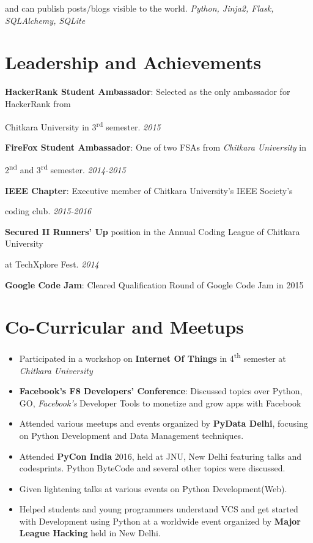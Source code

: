 \documentclass{ss_resume}
\begin{document}
and can publish posts/blogs visible to the world. \hfill \textit{Python, Jinja2, Flask, SQLAlchemy, SQLite}

\section{Leadership and Achievements}

\textbf{HackerRank Student Ambassador}: Selected as the only ambassador for HackerRank from

Chitkara University in 3\textsuperscript{rd} semester. \hfill \textit{2015}

\medskip

\textbf{FireFox Student Ambassador}: One of two FSAs from \textit{Chitkara University} in

2\textsuperscript{nd} and 3\textsuperscript{rd} semester. \hfill \textit{2014-2015}

\medskip

\textbf{IEEE Chapter}: Executive member of Chitkara University's IEEE Society's

coding club. \hfill \textit{2015-2016}

\medskip

\textbf{Secured II Runners' Up} position in the Annual Coding League of Chitkara University

at TechXplore Fest. \hfill \textit{2014}

\medskip

\textbf{Google Code Jam}: Cleared Qualification Round of Google Code Jam in 2015


\section{Co-Curricular and Meetups}

\begin{itemize}
    \item Participated in a workshop on \textbf{Internet Of Things} in 4\textsuperscript{th} semester at \textit{Chitkara University}
    \item{\textbf{Facebook's F8 Developers' Conference}: Discussed topics over Python, GO, \textit{Facebook's} Developer Tools to monetize and grow apps with Facebook}
    \item Attended various meetups and events organized by \textbf{PyData Delhi}, focusing on Python Development and Data Management techniques.
    \item Attended \textbf{PyCon India} 2016, held at JNU, New Delhi featuring talks and codesprints. Python ByteCode and several other topics were discussed.
    \item Given lightening talks at various events on Python Development(Web).
    \item Helped students and young programmers understand VCS and get started with Development using Python at a worldwide event organized by \textbf{Major League Hacking} held in New Delhi.
\end{itemize}
\end{document}
